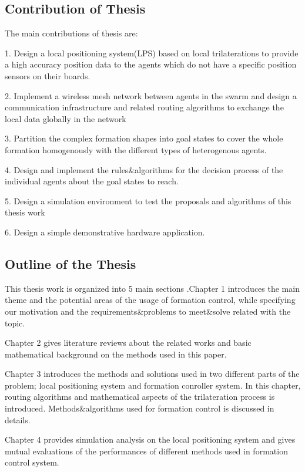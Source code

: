 \documentclass[twoside]{article}
\begin{document}
\subsection{Contribution of Thesis}

The main contributions of thesis are:

1. Design a local positioning system(LPS) based on local trilaterations to provide a high accuracy position data to the agents which do not have a specific position sensors on their boards.

2. Implement a wireless mesh network between agents in the swarm and design a communication infrastructure and related routing algorithms to exchange the local data globally in the network

3. Partition the complex formation shapes into goal states to cover the whole formation homogenously with the different types of heterogenous agents.

4. Design and implement the rules$\&$algorithms for the decision process of the individual agents about the goal states to reach.

5. Design a simulation environment to test the proposals and algorithms of this thesis work

6. Design a simple demonstrative hardware application.


\subsection{Outline of the Thesis}
This thesis work is organized into 5 main sections .Chapter 1 introduces the main theme and the potential areas of the usage of formation control, while specifying our motivation and the requirements$\&$problems to meet$\&$solve related with the topic.

Chapter 2 gives literature reviews about the related works and basic mathematical background on the methods used in this paper.

Chapter 3 introduces the methods and solutions used in two different parts of the problem; local positioning system and formation conroller system. In this chapter, routing algorithms and mathematical aspects of the trilateration process is introduced. Methods$\&$algorithms used for formation control is discussed in details.

Chapter 4 provides simulation analysis on the local positioning system and gives mutual evaluations of the performances of different methods used in formation control system.
\end{document}
